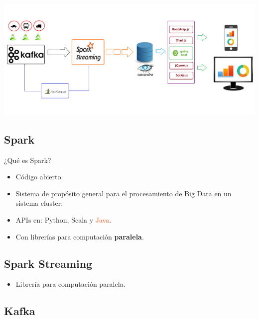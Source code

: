 \documentclass[dvipsnames]{beamer}
\begin{document}
        \begin{frame}
          \begin{center}
          \includegraphics[scale=0.5]{img/arquitectura.jpg}  
          \end{center}          
        \end{frame}
	
	\subsection{Spark}
	
	\begin{frame}
		¿Qué es Spark?
		\begin{itemize}
			\item Código abierto.
			\item Sistema de propósito general para el procesamiento de Big Data en un sistema cluster.
			\item APIs en: \textcolor{deepBlue}{Python}, \textcolor{deepRed}{Scala} y \textcolor{orangeRed}{Java}.
			\item Con librerías para computación \textbf{paralela}.
		\end{itemize}
	\end{frame}
	
	\subsection{Spark Streaming}
	
	\begin{frame}
		\begin{itemize}
			\item Librería para computación paralela.
		\end{itemize}
	\end{frame}
	
	\subsection{Kafka}
	
\end{document}
